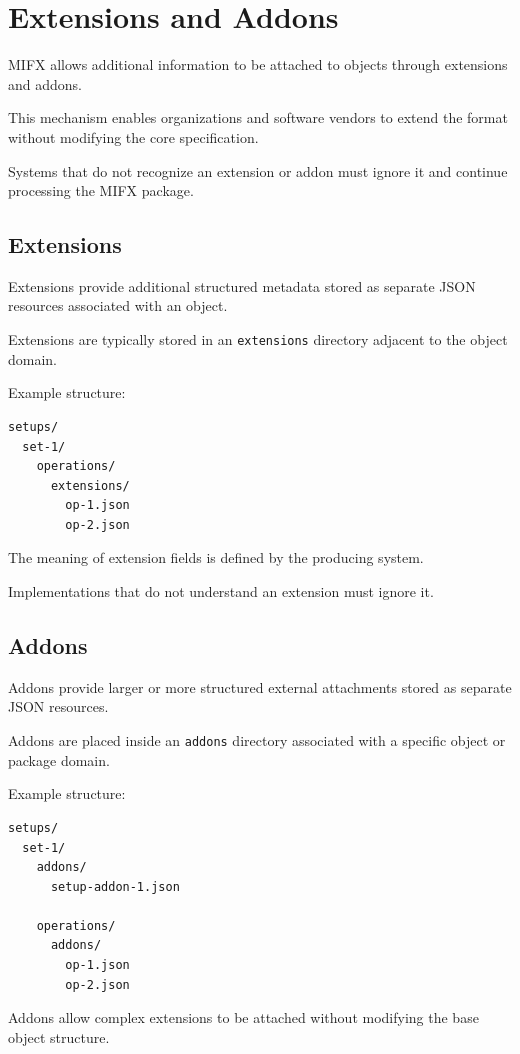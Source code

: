 \section{Extensions and Addons}

MIFX allows additional information to be attached to objects through extensions and addons.

This mechanism enables organizations and software vendors to extend the format without modifying the core specification.

Systems that do not recognize an extension or addon must ignore it and continue processing the MIFX package.

\subsection{Extensions}

Extensions provide additional structured metadata stored as separate JSON resources associated with an object.

Extensions are typically stored in an \texttt{extensions} directory adjacent to the object domain.

Example structure:

\begin{verbatim}
setups/
  set-1/
    operations/
      extensions/
        op-1.json
        op-2.json
\end{verbatim}

The meaning of extension fields is defined by the producing system.

Implementations that do not understand an extension must ignore it.

\subsection{Addons}

Addons provide larger or more structured external attachments stored as separate JSON resources.

Addons are placed inside an \texttt{addons} directory associated with a specific object or package domain.

Example structure:

\begin{verbatim}
setups/
  set-1/
    addons/
      setup-addon-1.json

    operations/
      addons/
        op-1.json
        op-2.json
\end{verbatim}

Addons allow complex extensions to be attached without modifying the base object structure.

